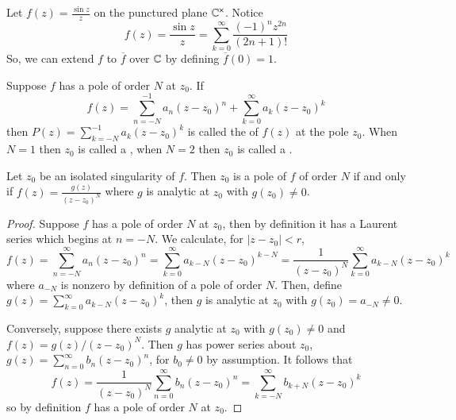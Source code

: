 \documentclass[12pt, a4paper, oneside, openright, titlepage]{book}
\begin{document}
\begin{eg}
    Let $f(z) = \frac{\sin z}{z}$ on the punctured plane $\mathbb C^{\times}$. Notice \begin{equation*}
        f(z) = \frac{\sin z}{z} = \sum_{k=0}^{\infty}\frac{(-1)^nz^{2n}}{(2n+1)!}
    \end{equation*}
    So, we can extend $f$ to $\overline{f}$ over $\mathbb C$ by defining $\overline{f}(0) = 1$.
\end{eg}

\begin{defn}
    Suppose $f$ has a pole of order $N$ at $z_0$. If \begin{equation*}
        f(z) = \sum_{n=-N}^{-1}a_n(z-z_0)^n + \sum_{k=0}^{\infty}a_k(z-z_0)^k
    \end{equation*}
    then $P(z) = \sum_{k=-N}^{-1}a_k(z-z_0)^k$ is called the  of $f(z)$ at the pole $z_0$. When $N = 1$ then $z_0$ is called a , when $N = 2$ then $z_0$ is called a .
\end{defn}


\begin{thm}
    Let $z_0$ be an isolated singularity of $f$. Then $z_0$ is a pole of $f$ of order $N$ if and only if $f(z) = \frac{g(z)}{(z-z_0)^N}$ where $g$ is analytic at $z_0$ with $g(z_0) \neq 0$.
\end{thm}
\begin{proof}
    Suppose $f$ has a pole of order $N$ at $z_0$, then by definition it has a Laurent series which begins at $n=-N$. We calculate, for $|z-z_0| < r$, \begin{equation*}
        f(z) = \sum_{n=-N}^{\infty}a_n(z-z_0)^n = \sum_{k=0}^{\infty}a_{k-N}(z-z_0)^{k-N} = \frac{1}{(z-z_0)^N}\sum_{k=0}^{\infty}a_{k-N}(z-z_0)^k
    \end{equation*}
    where $a_{-N}$ is nonzero by definition of a pole of order $N$. Then, define $g(z) = \sum_{k=0}^{\infty}a_{k-N}(z-z_0)^k$, then $g$ is analytic at $z_0$ with $g(z_0) = a_{-N} \neq 0$. 

    Conversely, suppose there exists $g$ analytic at $z_0$ with $g(z_0) \neq 0$ and $f(z) = g(z)/(z-z_0)^N$. Then $g$ has power series about $z_0$, $g(z) = \sum_{n=0}^{\infty}b_n(z-z_0)^n$, for $b_0 \neq 0$ by assumption. It follows that \begin{equation*}
        f(z) = \frac{1}{(z-z_0)^N}\sum_{n=0}^{\infty}b_n(z-z_0)^n = \sum_{k=-N}^{\infty}b_{k+N}(z-z_0)^k
    \end{equation*}
    so by definition $f$ has a pole of order $N$ at $z_0$.
\end{proof}
\end{document}
